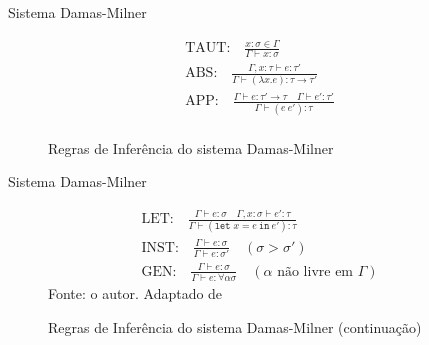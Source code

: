 \begin{frame}{Sistema Damas-Milner}
    \begin{figure}[ht!]
        \caption{Regras de Inferência do sistema Damas-Milner}
        \centering
        \[
            \begin{array}{c}
                \text{TAUT:} \quad \displaystyle\frac{x : \sigma \in \Gamma}{\Gamma \vdash x : \sigma}                                               \\[25pt]

                \text{ABS:} \quad \displaystyle\frac{\Gamma, x : \tau \vdash e : \tau'}{\Gamma \vdash (\lambda x. e) : \tau \to \tau'}               \\[25pt]

                \text{APP:} \quad \displaystyle\frac{\Gamma \vdash e : \tau' \to \tau \quad \Gamma \vdash e' : \tau'}{\Gamma \vdash (e \ e') : \tau} \\[25pt]
            \end{array}
        \]
    \end{figure}
\end{frame}

\begin{frame}{Sistema Damas-Milner}
    \begin{figure}[ht!]
        \caption{Regras de Inferência do sistema Damas-Milner (continuação)}
        \centering
        \[
            \begin{array}{c}
                \text{LET:} \quad \displaystyle\frac{\Gamma \vdash e : \sigma \quad \Gamma, x : \sigma \vdash e' : \tau}{\Gamma \vdash (\texttt{let } x = e \ \texttt{in} \ e') : \tau} \\[25pt]

                \text{INST:} \quad \displaystyle\frac{\Gamma \vdash e : \sigma}{\Gamma \vdash e : \sigma'} \quad (\sigma > \sigma')                                                     \\[25pt]

                \text{GEN:} \quad \displaystyle\frac{\Gamma \vdash e : \sigma}{\Gamma \vdash e : \forall \alpha \sigma} \quad (\alpha \text{ não livre em } \Gamma)
            \end{array}
        \]
        \small{Fonte: o autor. Adaptado de~\cite{DAMAS1982}}
    \end{figure}
\end{frame}
